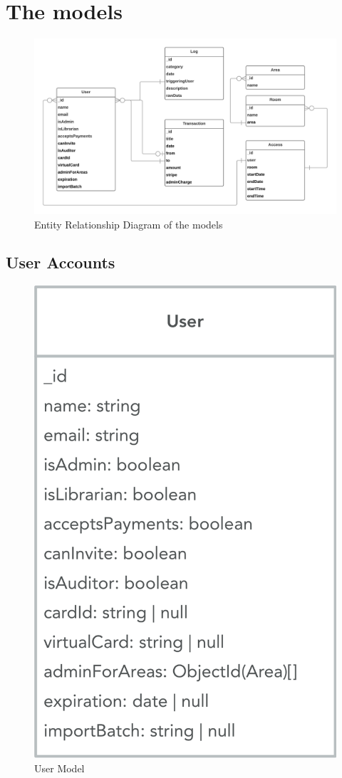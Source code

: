\documentclass[11pt,a4paper]{report}
\begin{document}
\section{The models}
\begin{figure}[H]
\begin{center}
	\includegraphics[width=\textwidth]{assets/models_relation}
	\caption{Entity Relationship Diagram of the models}
\end{center}
\end{figure}
\subsection{User Accounts}
\begin{figure}[H]
\begin{center}
	\includegraphics[width=.4\textwidth]{assets/user_model}
	\caption{User Model}
\end{center}
\end{figure}
\end{document}
